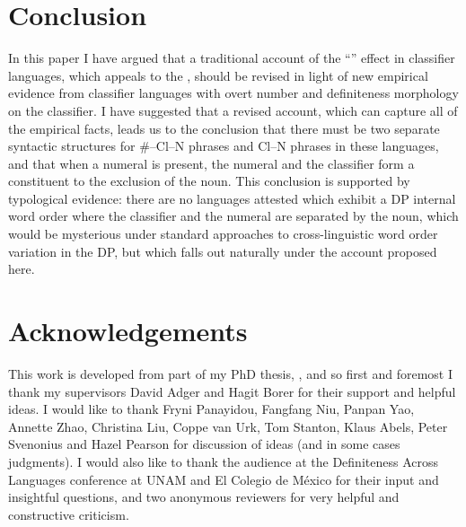 \documentclass[output=paper
,modfonts
,nonflat]{langsci/langscibook}
\begin{document}
\section{Conclusion}

In this paper I have argued that a traditional account of the ``'' effect in classifier languages, which appeals to the , should be revised in light of new empirical evidence from classifier languages with overt number and definiteness morphology on the classifier. I have suggested that a revised account, which can capture all of the empirical facts, leads us to the conclusion that there must be two separate syntactic structures for \#--Cl--N phrases and Cl--N phrases in these languages, and that when a numeral is present, the numeral and the classifier form a constituent to the exclusion of the noun. This conclusion is supported by typological evidence: there are no languages attested which exhibit a DP internal word order where the classifier and the numeral are separated by the noun, which would be mysterious under standard approaches to cross-linguistic word order variation in the DP, but which falls out naturally under the account proposed here.

\section*{Acknowledgements}\largerpage
This work is developed from part of my PhD thesis, \citet{Hall2015}, and so first and foremost I thank my supervisors David Adger and Hagit Borer for their support and helpful ideas. I would like to thank Fryni Panayidou, Fangfang Niu, Panpan Yao, Annette Zhao, Christina Liu, Coppe van Urk, Tom Stanton, Klaus Abels, Peter Svenonius and Hazel Pearson for discussion of ideas (and in some cases judgments). I would also like to thank the audience at the Definiteness Across Languages conference at UNAM and El Colegio de México for their input and insightful questions, and two anonymous reviewers for very helpful and constructive criticism.
\end{document}
